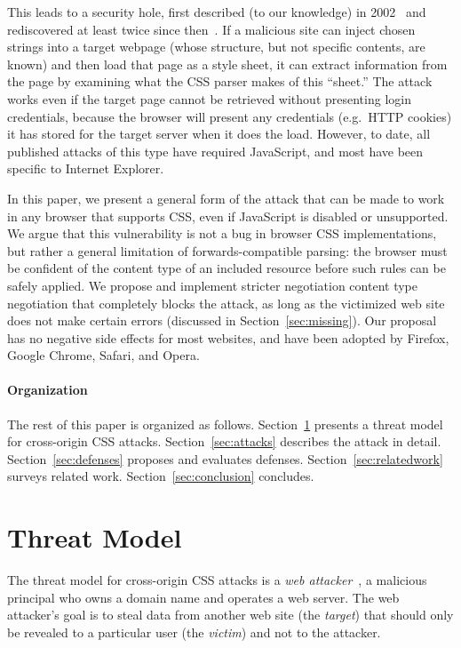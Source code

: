 \documentclass{acm_proc_article-sp}
\begin{document}
This leads to a security hole, first described (to our knowledge) in
2002~\cite{cssxss02} and rediscovered at least twice since 
then~\cite{cssxss05,cssxss08}.  If a malicious site can inject chosen
strings into a target webpage (whose structure, but not specific
contents, are known) and then load that page as a style sheet, it can
extract information from the page by examining what the CSS parser
makes of this ``sheet.'' The attack works even if the target page cannot
be retrieved without presenting login credentials, because the browser
will present any credentials (e.g.~HTTP cookies) it has stored for
the target server when it does the load.  However, to date, all
published attacks of this type have required JavaScript, and most have
been specific to Internet Explorer.

In this paper, we present a general form of the attack that can be made to
work in any browser that supports CSS, even if JavaScript is disabled or
unsupported. We argue that this vulnerability is not a bug in browser CSS
implementations, but rather a general limitation of forwards-compatible
parsing: the browser must be confident of the content type of an included
resource before such rules can be safely applied. We propose and implement
stricter negotiation content type negotiation that completely blocks the
attack, as long as the victimized web site does not make certain errors
(discussed in Section~\ref{sec:missing}). Our proposal has no negative side
effects for most websites, and have been adopted by Firefox, Google Chrome,
Safari, and Opera.

\paragraph{Organization}
The rest of this paper is organized as
follows. Section~\ref{sec:threatmodel} presents a threat model for
cross-origin CSS attacks.  Section~\ref{sec:attacks} describes the
attack in detail. Section~\ref{sec:defenses} proposes and evaluates
defenses.  Section~\ref{sec:relatedwork} surveys related work.
Section~\ref{sec:conclusion} concludes.

\section{Threat Model} \label{sec:threatmodel}

The threat model for cross-origin CSS attacks is a \emph{web
attacker}~\cite{jackson09thesis}, a malicious principal who
owns a domain name and operates a web server. The web attacker's
goal is to steal data from another web site (the \emph{target})
that should only be revealed to a particular user (the
\emph{victim}) and not to the attacker.
\end{document}
